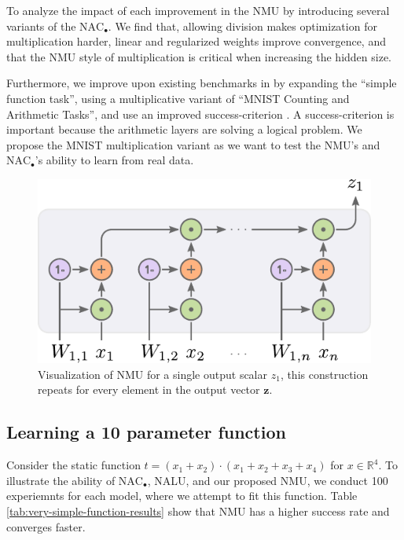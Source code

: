To analyze the impact of each improvement in the NMU by introducing several variants of the $\text{NAC}_{\bullet}$.
We find that, allowing division makes optimization for multiplication harder, linear and regularized weights improve convergence, and that the NMU style of multiplication is critical when increasing the hidden size.

Furthermore, we improve upon existing benchmarks in \citet{trask-nalu} by expanding the ``simple function task'', using a multiplicative variant of ``MNIST Counting and Arithmetic Tasks'', and use an improved success-criterion \citet{maep-madsen-johansen-2019}.
A success-criterion is important because the arithmetic layers are solving a logical problem.
We propose the MNIST multiplication variant as we want to test the NMU's and $\text{NAC}_{\bullet}$'s ability to learn from real data.

\begin{figure}[t]
\centering
\includegraphics[scale=0.7]{graphics/nmu.pdf}
\caption{Visualization of NMU for a single output scalar $z_1$, this construction repeats for every element in the output vector $\mathbf{z}$.}
\end{figure}

\subsection{Learning a 10 parameter function}
Consider the static function $t = (x_1 + x_2) \cdot (x_1 + x_2 + x_3 + x_4)$ for $x \in \mathbb{R}^4$. To illustrate the ability of $\mathrm{NAC}_{\bullet}$, NALU, and our proposed NMU, we conduct 100 experiemnts for each model, where we attempt to fit this function. Table \ref{tab:very-simple-function-results} show that NMU has a higher success rate and converges faster.

